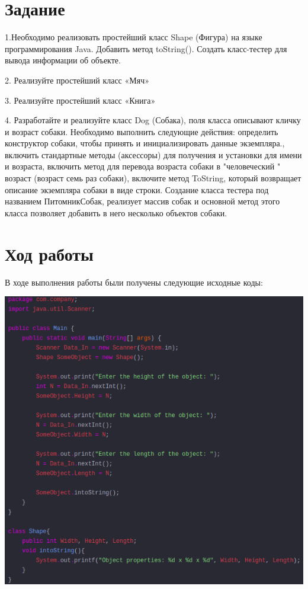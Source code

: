 \documentclass{article}
\begin{document}


\section{Задание}

1.Необходимо реализовать простейший класс Shape (Фигура) на языке программирования Java. Добавить метод toString(). Создать класс-тестер для вывода информации об объекте.

2. Реализуйте простейший класс «Мяч»

3. Реализуйте простейший класс «Книга»

4. Разработайте и реализуйте класс Dog (Собака), поля класса описывают кличку и возраст собаки. Необходимо выполнить следующие действия: определить конструктор собаки, чтобы принять и инициализировать данные экземпляра., включить стандартные методы (аксессоры) для получения и установки для имени и возраста, включить метод для перевода возраста собаки в "человеческий " возраст (возраст семь раз собаки), включите метод ToString, который возвращает описание экземпляра собаки в виде строки. Создание класса тестера под названием ПитомникСобак, реализует массив собак и основной метод этого класса позволяет добавить в него несколько объектов собаки.

\section{Ход работы}

В ходе выполнения работы были получены следующие исходные коды:

\includegraphics[width=0.7\linewidth]{view1.png}
\end{document}
